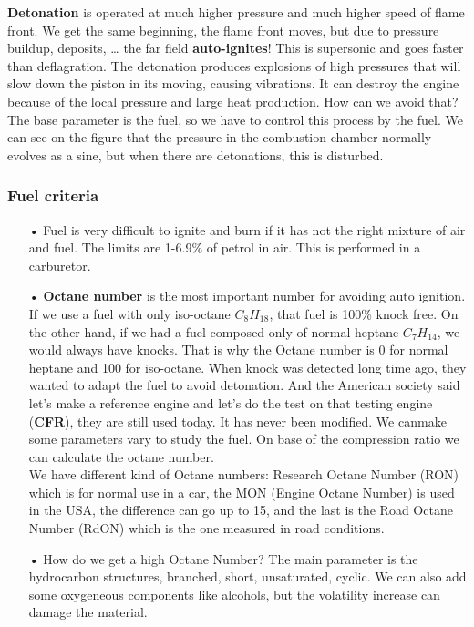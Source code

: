 \textbf{Detonation} is operated at much higher pressure and much higher speed of flame front. We get the same beginning, the flame front moves, but due to pressure buildup, deposits, … the far field \textbf{auto-ignites}! This is supersonic and goes faster than deflagration. The detonation produces explosions of high pressures that will slow down the piston in its moving, causing vibrations. It can destroy the engine because of the local pressure and large heat production. How can we avoid that? The base parameter is the fuel, so we have to control this process by the fuel. We can see on the figure that the pressure in the combustion chamber normally evolves as a sine, but when there are detonations, this is disturbed. 

\subsubsection{Fuel criteria}
\begin{itemize}
\item[•] Fuel is very difficult to ignite and burn if it has not the right mixture of air and fuel. The limits are 1-6.9\% of petrol in air. This is performed in a carburetor.\\

\item[•] \textbf{Octane number} is the most important number for avoiding auto ignition. If we use a fuel with only iso-octane $C_8H_{18}$, that fuel is 100\% knock free. On the other hand, if we had a fuel composed only of normal heptane  $C_7H_{14}$, we would always have knocks. That is why the Octane number is 0 for normal heptane and 100 for iso-octane. When knock was detected long time ago, they wanted to adapt the fuel to avoid detonation. And the American society said let's make a reference engine and let's do the test on that testing engine (\textbf{CFR}), they are still used today. It has never been modified. We canmake some parameters vary to study the fuel. On base of the compression ratio we can calculate the octane number. \\

We have different kind of Octane numbers: Research Octane Number (RON) which is for normal use in a car, the MON (Engine Octane Number) is used in the USA, the difference can go up to 15, and the last is the Road Octane Number (RdON) which is the one measured in road conditions. \\

\item[•] How do we get a high Octane Number? The main parameter is the hydrocarbon structures, branched, short, unsaturated, cyclic. We can also add some oxygeneous components like alcohols, but the volatility increase can damage the material. 
\end{itemize}

